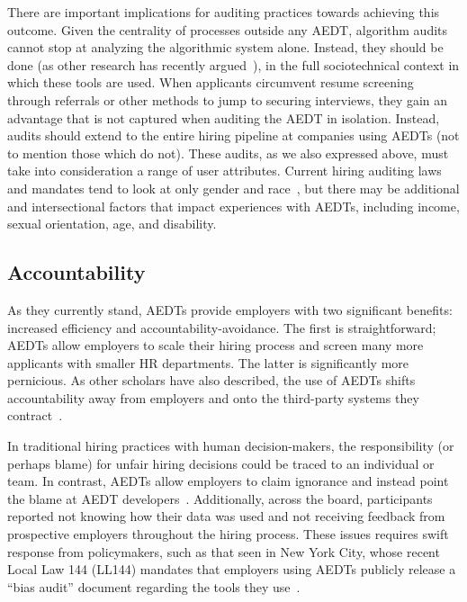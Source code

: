 There are important implications for auditing practices towards achieving this outcome. Given the centrality of processes outside any AEDT, algorithm audits cannot stop at analyzing the algorithmic system alone. Instead, they should be done (as other research has recently argued~\cite{lam2023STA}), in the full sociotechnical context in which these tools are used. When applicants circumvent resume screening through referrals or other methods to jump to securing interviews, they gain an advantage that is not captured when auditing the AEDT in isolation. Instead, audits should extend to the entire hiring pipeline at companies using AEDTs (not to mention those which do not). These audits, as we also expressed above, must take into consideration a range of user attributes. Current hiring auditing laws and mandates tend to look at only gender and race~\cite{locallaw144}, but there may be additional and intersectional factors that impact experiences with AEDTs, including income, sexual orientation, age, and disability. 

\subsection{Accountability}
As they currently stand, AEDTs provide employers with two significant benefits: increased efficiency and accountability-avoidance. The first is straightforward; AEDTs allow employers to scale their hiring process and screen many more applicants with smaller HR departments. The latter is significantly more pernicious. As other scholars have also described, the use of AEDTs shifts accountability away from employers and onto the third-party systems they contract~\cite{sanchez2020does, ajunwa2019paradox, wilson2021building}. 

In traditional hiring practices with human decision-makers, the responsibility (or perhaps blame) for unfair hiring decisions could be traced to an individual or team. In contrast, AEDTs allow employers to claim ignorance and instead point the blame at AEDT developers~\cite{wright2024null, groves2024auditing}.  Additionally, across the board, participants reported not knowing how their data was used and not receiving feedback from prospective employers throughout the hiring process. These issues requires swift response from policymakers, such as that seen in New York City, whose recent Local Law 144 (LL144) mandates that employers using AEDTs publicly release a ``bias audit'' document regarding the tools they use~\cite{locallaw144}. 

